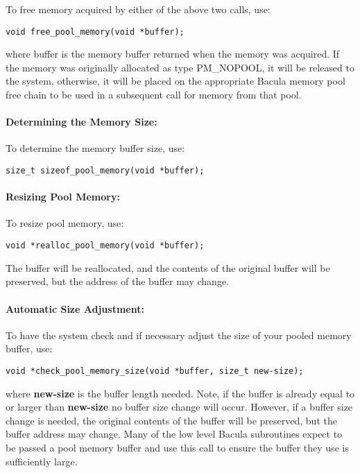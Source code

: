 To free memory acquired by either of the above two calls, use:

\footnotesize
\begin{verbatim}
void free_pool_memory(void *buffer);
\end{verbatim}
\normalsize

where buffer is the memory buffer returned when the memory was acquired. If
the memory was originally allocated as type PM\_NOPOOL, it will be released to
the system, otherwise, it will be placed on the appropriate Bacula memory pool
free chain to be used in a subsequent call for memory from that pool.

\paragraph*{Determining the Memory Size:}

To determine the memory buffer size, use:

\footnotesize
\begin{verbatim}
size_t sizeof_pool_memory(void *buffer);
\end{verbatim}
\normalsize

\paragraph*{Resizing Pool Memory:}

To resize pool memory, use:

\footnotesize
\begin{verbatim}
void *realloc_pool_memory(void *buffer);
\end{verbatim}
\normalsize

The buffer will be reallocated, and the contents of the original buffer will
be preserved, but the address of the buffer may change.

\paragraph*{Automatic Size Adjustment:}

To have the system check and if necessary adjust the size of your pooled
memory buffer, use:

\footnotesize
\begin{verbatim}
void *check_pool_memory_size(void *buffer, size_t new-size);
\end{verbatim}
\normalsize

where {\bf new-size} is the buffer length needed. Note, if the buffer is
already equal to or larger than {\bf new-size} no buffer size change will
occur. However, if a buffer size change is needed, the original contents of
the buffer will be preserved, but the buffer address may change. Many of the
low level Bacula subroutines expect to be passed a pool memory buffer and use
this call to ensure the buffer they use is sufficiently large.

